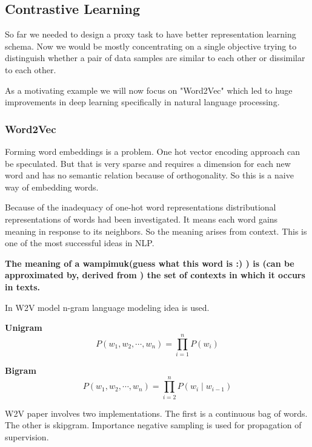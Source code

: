 \documentclass{article}
\begin{document}
\subsection{Contrastive Learning}
So far we needed to design a proxy task to have better representation
learning schema.
Now we would be mostly concentrating on a single objective trying to
distinguish whether a pair of data samples are similar to each other or
dissimilar to each other.
 
As a motivating example we will now focus on "Word2Vec" \cite{mikolov2013efficient} which led to
huge improvements in deep learning specifically in natural language processing.
 
\subsubsection{Word2Vec}
Forming word embeddings is a problem.
One hot vector encoding approach can be speculated.
But that is very sparse and requires a dimension for
each new word and has no semantic relation because of
orthogonality.
So this is a naive way of embedding words.
 
Because of the inadequacy of one-hot word representations
distributional representations of words had been investigated.
It means each word gains meaning in response to its neighbors.
So the meaning arises from context. This is one of the most successful
ideas in NLP.
 
\textbf{The meaning of a wampimuk(guess what this word is :) ) is (can be approximated by, derived
from ) the set of contexts in which it occurs in texts.}
 
\par
In W2V model n-gram language modeling idea is used.
 
\textbf{Unigram}
\begin{equation}
   P\left(w_{1}, w_{2}, \cdots, w_{n}\right)
   =\prod_{i=1}^{n} P\left(w_{i}\right)
   \end{equation}
 
\textbf{Bigram}
\begin{equation}
       P\left(w_{1}, w_{2}, \cdots, w_{n}\right)=
       \prod_{i=2}^{n} P\left(w_{i} \mid w_{i-1}\right)
\end{equation}
 
W2V paper involves two implementations.
The first is a continuous bag of words.
The other is skipgram.
Importance negative sampling is used for propagation of supervision.
 
\end{document}
